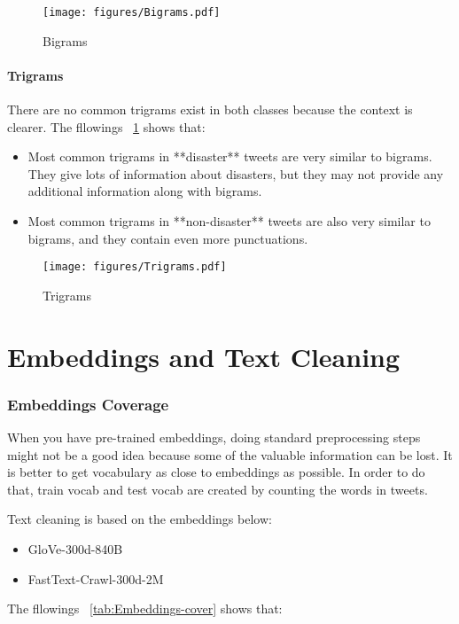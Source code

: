 \begin{figure}[htbp]
	\centering
	\texttt{[image: figures/Bigrams.pdf]}
	\caption{Bigrams}
	\label{fig:Bigrams}
\end{figure}

\paragraph{Trigrams}
There are no common trigrams exist in both classes  because the context is clearer.
The fllowings ~\cref{fig:Bigrams} shows that:
\begin{itemize}
	\item
	Most common trigrams in **disaster** tweets are very similar to bigrams. 
	They give lots of information about disasters, but they may not provide any 
	additional information along with bigrams.
	\item
	Most common trigrams in **non-disaster** tweets are also very similar to bigrams, and they contain even more punctuations.
\end{itemize}

\begin{figure}[htbp]
	\centering
	\texttt{[image: figures/Trigrams.pdf]}
	\caption{Trigrams}
	\label{fig:Trigrams}
\end{figure}


\section{Embeddings and Text Cleaning}
\subsubsection{Embeddings Coverage}

When you have pre-trained embeddings, doing standard preprocessing 
steps  might not be a good idea because some of the valuable 
information can be lost. It is better to get vocabulary as close 
to embeddings as possible. In order to do that, train vocab and 
test vocab are created by counting the words in tweets.

Text cleaning is based on the embeddings below:

\begin{itemize}
	\item GloVe-300d-840B
	\item FastText-Crawl-300d-2M 
\end{itemize}

The fllowings ~\cref{tab:Embeddings-cover} shows that:
                
